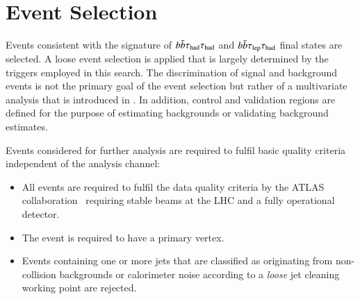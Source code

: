 \section{Event Selection}%
\label{sec:event_selection}

Events consistent with the signature of $b\bar{b}\tau_{\text{had}}\tau_{\text{had}}$ and $b\bar{b}\tau_{\text{lep}}\tau_{\text{had}}$
final states are selected. A loose event selection is applied that is largely
determined by the triggers employed in this search. The discrimination of signal
and background events is not the primary goal of the event selection but rather
of a multivariate analysis that is introduced in
. In addition, control and validation regions
are defined for the purpose of estimating backgrounds or validating background
estimates.

Events considered for further analysis are required to fulfil basic
quality criteria independent of the analysis channel:
\begin{itemize}

\item All events are required to fulfil the data quality criteria by
  the ATLAS collaboration~\cite{DAPR-2018-01} requiring stable beams
  at the LHC and a fully operational detector.

\item The event is required to have a primary vertex.

\item Events containing one or more jets that are classified as originating
  from non-collision backgrounds or calorimeter noise according to a
  \emph{loose} jet cleaning~\cite{ATLAS-CONF-2015-029} working point are
  rejected.
\end{itemize}

